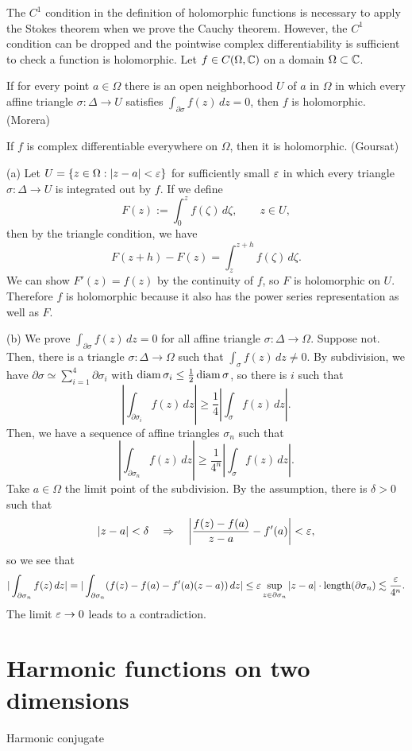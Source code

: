 \documentclass{../../large}
\begin{document}
\begin{prb}
The $C^1$ condition in the definition of holomorphic functions is necessary to apply the Stokes theorem when we prove the Cauchy theorem.
However, the $C^1$ condition can be dropped and the pointwise complex differentiability is sufficient to check a function is holomorphic.
Let $f\in C(\Omega,\mathbb{C})$ on a domain $\Omega\subset\mathbb{C}$.
\begin{parts}
\item If for every point $a\in\Omega$ there is an open neighborhood $U$ of $a$ in $\Omega$ in which every affine triangle $\sigma:\Delta\to U$ satisfies $\int_{\partial\sigma}f(z)\,dz=0$, then $f$ is holomorphic. (Morera)
\item If $f$ is complex differentiable everywhere on $\Omega$, then it is holomorphic. (Goursat)
\end{parts}
\end{prb}
\begin{pf}
(a)
Let $U=\{z\in\Omega:|z-a|<\varepsilon\}$ for sufficiently small $\varepsilon$ in which every triangle $\sigma:\Delta\to U$ is integrated out by $f$.
If we define
\[F(z):=\int_0^zf(\zeta)\,d\zeta,\qquad z\in U,\]
then by the triangle condition, we have
\[F(z+h)-F(z)=\int_z^{z+h}f(\zeta)\,d\zeta.\]
We can show $F'(z)=f(z)$ by the continuity of $f$, so $F$ is holomorphic on $U$.
Therefore $f$ is holomorphic because it also has the power series representation as well as $F$.

(b)
We prove $\int_{\partial\sigma}f(z)\,dz=0$ for all affine triangle $\sigma:\Delta\to\Omega$.
Suppose not.
Then, there is a triangle $\sigma:\Delta\to\Omega$ such that $\int_\sigma f(z)\,dz\ne0$.
By subdivision, we have $\partial\sigma\simeq\sum_{i=1}^4\partial\sigma_i$ with $\operatorname{diam}\sigma_i\le\frac12\operatorname{diam}\sigma$, so there is $i$ such that
\[|\int_{\partial\sigma_i}f(z)\,dz|\ge\frac14|\int_\sigma f(z)\,dz|.\]
Then, we have a sequence of affine triangles $\sigma_n$ such that
\[|\int_{\partial\sigma_n}f(z)\,dz|\ge\frac1{4^n}|\int_\sigma f(z)\,dz|.\]
Take $a\in\Omega$ the limit point of the subdivision.
By the assumption, there is $\delta>0$ such that
\[|z-a|<\delta\quad\Rightarrow\quad\left|\frac{f(z)-f(a)}{z-a}-f'(a)\right|<\varepsilon,\]
so we see that
\[|\int_{\partial\sigma_n}f(z)\,dz|=|\int_{\partial\sigma_n}(f(z)-f(a)-f'(a)(z-a))\,dz|\le\varepsilon\sup_{z\in\partial\sigma_n}|z-a|\cdot\operatorname{length}(\partial\sigma_n)\lesssim\frac{\varepsilon}{4^n}.\]
The limit $\varepsilon\to0$ leads to a contradiction.
\end{pf}


\section{Harmonic functions on two dimensions}
Harmonic conjugate
\end{document}
